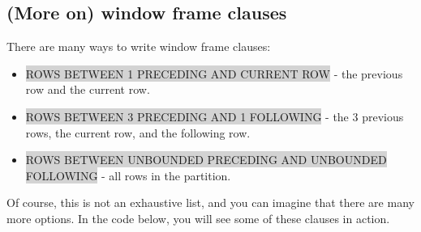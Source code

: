 \documentclass[11pt]{article}
\begin{document}
{{{{{{{{\subsection{(More on) window frame clauses}
There are many ways to write window frame clauses:
\begin{itemize}[leftmargin = *]
\item \colorbox{lightgray}{ROWS BETWEEN 1 PRECEDING AND CURRENT ROW} - the previous row and the current row.
\item \colorbox{lightgray}{ROWS BETWEEN 3 PRECEDING AND 1 FOLLOWING} - the 3 previous rows, the current row, and the following row.
\item \colorbox{lightgray}{ROWS BETWEEN UNBOUNDED PRECEDING AND UNBOUNDED FOLLOWING} - all rows in the partition.
\end{itemize}
Of course, this is not an exhaustive list, and you can imagine that there are many more options. In the code below, you will see some of these clauses in action.

}}}}}}}}
\end{document}
